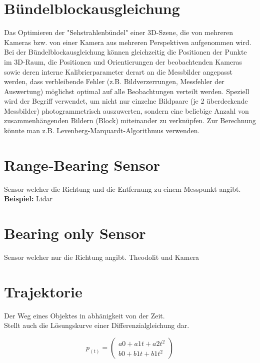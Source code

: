 \section{Bündelblockausgleichung}
\label{uebersicht:sec:Bündelblockausgleichung}
	Das Optimieren der "Sehstrahlenbündel" einer 3D-Szene, die von mehreren Kameras bzw. von einer Kamera aus mehreren Perspektiven
	aufgenommen wird. Bei der Bündelblockausgleichung können gleichzeitig die Positionen der Punkte im 3D-Raum, die Positionen und
	Orientierungen der beobachtenden Kameras sowie deren interne Kalibrierparameter derart an die Messbilder angepasst werden, dass
	verbleibende Fehler (z.B. Bildverzerrungen, Messfehler der Auswertung) möglichst optimal auf alle Beobachtungen verteilt werden.
	Speziell wird der Begriff verwendet, um nicht nur einzelne Bildpaare (je 2 überdeckende Messbilder) photogrammetrisch auszuwerten,
	sondern eine beliebige Anzahl von zusammenhängenden Bildern (Block) miteinander zu verknüpfen. Zur Berechnung könnte man z.B.
	Levenberg-Marquardt-Algorithmus verwenden. 

\section{Range‐Bearing Sensor}
\label{uebersicht:sec:Range‐BearingSensor}
	Sensor welcher die Richtung und die Entfernung zu einem Messpunkt angibt. \\ \textbf{Beispiel:} Lidar

\section{Bearing only Sensor}
\label{uebersicht:sec:BearingonlySensor}
	Sensor welcher nur die Richtung angibt. Theodolit und Kamera

\section{Trajektorie}
\label{uebersicht:sec:Trajektorie}
	Der Weg eines Objektes in abhänigkeit von der Zeit.\\
	Stellt auch die Lösungskurve einer Differenzialgleichung dar.

\begin{equation}
p_(t) = 
\left(
\begin{array}{c}
a0 + a1t + a2t^2 \\
b0 + b1t + b1t^2
\end{array} 
\right)
\end{equation} 
	
